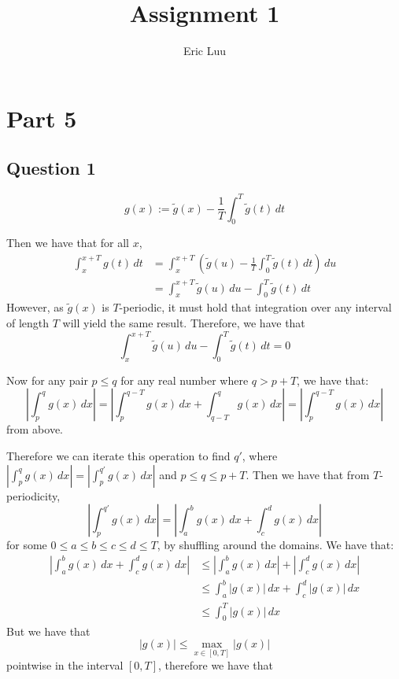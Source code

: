 \documentclass{article}
\title{Assignment 1}
\author{Eric Luu}
\theoremstyle{definition}
\numberwithin{theorem}{section}
\numberwithin{equation}{section}
\begin{document}
\maketitle
\section{Part 5}
\subsection{Question 1}


\begin{equation}
	g(x) := \tilde{g}(x) - \frac{1}{T} \int_{0}^{T} \tilde{g}(t) \, dt
\end{equation}

Then we have that for all $x$,
\begin{align*}
	\int_{x}^{x + T} g(t) \, dt &= \int_{x}^{x + T} \left(\tilde{g}(u) - \frac{1}{T} \int_{0}^{T} \tilde{g}(t) \, dt\right) \, du\\
	&= \int_{x}^{x + T} \tilde{g}(u)\, du - \int_{0}^{T} \tilde{g}(t) \, dt
\end{align*}
However, as $\tilde{g}(x)$ is $T$-periodic, it must hold that integration over any interval of length $T$ will yield the same result. Therefore, we have that
\begin{equation}
	\int_{x}^{x + T} \tilde{g}(u)\, du - \int_{0}^{T} \tilde{g}(t) \, dt = 0
\end{equation}

Now for any pair $p \leq q$ for any real number where $q > p + T$, we have that:
\begin{equation}
	\left| \int_{p}^{q} g(x) \, dx \right| = \left| \int_{p}^{q-T} g(x) \, dx +  \int_{q - T}^{q} g(x) \, dx\right| = \left| \int_{p}^{q-T} g(x) \, dx  \right|
\end{equation}
from above.

Therefore we can iterate this operation to find $q'$, where $\left| \int_{p}^{q} g(x) \, dx \right| = \left| \int_{p}^{q'} g(x) \, dx \right|$ and $p \leq q \leq p + T$. Then we have that from $T$-periodicity,
\begin{equation}
	\left| \int_{p}^{q'} g(x) \, dx \right| = \left| \int_{a}^{b} g(x) \, dx + \int_{c}^{d} g(x) \, dx \right|
\end{equation}
for some $ 0 \leq a \leq b \leq c \leq d \leq T$, by shuffling around the domains. We have that:
\begin{align*}
	\left| \int_{a}^{b} g(x) \, dx + \int_{c}^{d} g(x) \, dx \right| &\leq \left| \int_{a}^{b} g(x) \, dx \right| + \left| \int_{c}^{d} g(x) \, dx \right|\\
	&\leq  \int_{a}^{b} |g(x)| \, dx +\int_{c}^{d} |g(x)| \, dx\\
	&\leq \int_{0}^T |g(x)| \, dx
\end{align*}
But we have that 
\begin{equation}
	|g(x)| \leq \max_{x \in [0, T]} |g(x)|
\end{equation}
pointwise in the interval $[0, T]$, therefore we have that
\end{document}
